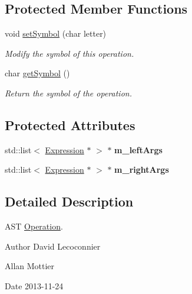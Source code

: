 \subsection*{Protected Member Functions}
\begin{DoxyCompactItemize}
\item 
void \hyperlink{class_operation_a11cd66e5dbdf38479cff9543a75799ee}{set\-Symbol} (char letter)
\begin{DoxyCompactList}\small\item\em Modify the symbol of this operation. \end{DoxyCompactList}\item 
char \hyperlink{class_operation_ada6e548dc024f08e744b6dc67f76fece}{get\-Symbol} ()
\begin{DoxyCompactList}\small\item\em Return the symbol of the operation. \end{DoxyCompactList}\end{DoxyCompactItemize}
\subsection*{Protected Attributes}
\begin{DoxyCompactItemize}
\item 
\hypertarget{class_operation_a82e0aa90770e887f1471eb04015cc8c7}{std\-::list$<$ \hyperlink{class_expression}{Expression} $\ast$ $>$ $\ast$ {\bfseries m\-\_\-left\-Args}}\label{class_operation_a82e0aa90770e887f1471eb04015cc8c7}

\item 
\hypertarget{class_operation_a7cc352895cd94a1205e0d75288466d7f}{std\-::list$<$ \hyperlink{class_expression}{Expression} $\ast$ $>$ $\ast$ {\bfseries m\-\_\-right\-Args}}\label{class_operation_a7cc352895cd94a1205e0d75288466d7f}

\end{DoxyCompactItemize}


\subsection{Detailed Description}
A\-S\-T \hyperlink{class_operation}{Operation}. 

\begin{DoxyAuthor}{Author}
David Lecoconnier 

Allan Mottier 
\end{DoxyAuthor}
\begin{DoxyDate}{Date}
2013-\/11-\/24 
\end{DoxyDate}


